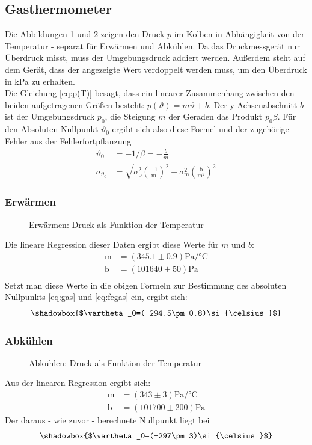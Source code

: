 \documentclass[12pt,a4paper,titlepage,headinclude,bibtotoc]{scrartcl}
\begin{document}
\subsection{Gasthermometer}
Die Abbildungen \ref{fig:gas1} und \ref{fig:gas2} zeigen den Druck $p$ im Kolben in Abhängigkeit von der Temperatur - separat für Erwärmen und Abkühlen.
Da das Druckmessgerät nur Überdruck misst, muss der Umgebungsdruck addiert werden.
Außerdem steht auf dem Gerät, dass der angezeigte Wert verdoppelt werden muss, um den Überdruck in kPa zu erhalten.\\


Die Gleichung \eqref{eq:p(T)} besagt, dass ein linearer Zusammenhang  zwischen den beiden aufgetragenen Größen besteht:
$p(\vartheta)=m\vartheta+b$.
Der y-Achsenabschnitt $b$ ist der Umgebungsdruck $p_0$, die Steigung $m$ der Geraden das Produkt $p_0\beta$.
Für den Absoluten Nullpunkt $\vartheta_0$ ergibt sich also diese Formel und der zugehörige Fehler aus der Fehlerfortpflanzung
\begin{align}
	\vartheta_0&=-1/\beta=-\frac{b}{m}
	\label{eq:gas}\\
	\sigma_{\vartheta_0}&=\sqrt{\sigma_\text{b}^2\left(\frac{-1}{\text{m}}\right)^2+\sigma_\text{m}^2\left(\frac{\text{b}}{\text{m}^2}\right)^2}
	\label{eq:fegas}
\end{align}
 
\subsubsection{Erwärmen}
\label{sec:gas1}
\begin{figure}[!h]
\centering

\caption{Erwärmen: Druck als Funktion der Temperatur}
\label{fig:gas1}
\end{figure}
Die lineare Regression dieser Daten ergibt diese Werte für $m$ und $b$:
\begin{align*}
	\text{m} &= (345.1\pm0.9)\si{\pascal/\celsius}\\
	\text{b} &= (101640\pm50)\si{\pascal}\\
\end{align*}
Setzt man diese Werte in die obigen Formeln zur Bestimmung des absoluten Nullpunkts \eqref{eq:gas} und \eqref{eq:fegas} ein, ergibt sich:
$$\shadowbox{$\vartheta_0=(-294.5\pm0.8)\si{\celsius}$}$$

\subsubsection{Abkühlen}
\label{sec:gas2}
\begin{figure}[!h]
\centering

\caption{Abkühlen: Druck als Funktion der Temperatur}
\label{fig:gas2}
\end{figure}
Aus der linearen Regression ergibt sich:
\begin{align}
	\text{m} &= (343\pm3)\si{\pascal/\celsius}\\
	\text{b} &= (101700\pm200)\si{\pascal}
\end{align}
Der daraus - wie zuvor - berechnete Nullpunkt liegt bei
$$\shadowbox{$\vartheta_0=(-297\pm3)\si{\celsius}$}$$
\end{document}
